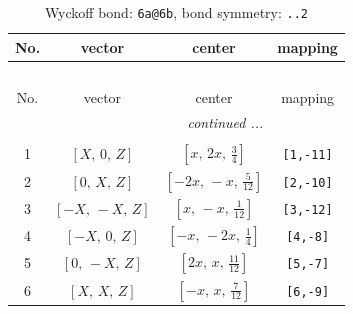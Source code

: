 \documentclass[fleqn,8pt]{jsarticle}
\begin{document}
\renewcommand{\arraystretch}{1.2}
\begin{longtable}{cccc}
\caption{Wyckoff bond: {\tt 6a@6b}, bond symmetry: {\tt ..2}}
 \\
 \hline \hline
No. & vector & center & mapping \\ \hline \endfirsthead

\multicolumn{3}{l}{\tablename\ \thetable{}} \\
 \hline \hline
No. & vector & center & mapping \\ \hline \endhead

 \hline \hline
\multicolumn{3}{r}{\footnotesize\it continued ...} \\ \endfoot

 \hline \hline
\multicolumn{3}{r}{} \\ \endlastfoot

1 & $\left[ X,\, 0,\, Z \right]$ & $\left[ x,\, 2 x,\, \frac{3}{4} \right]$ & {\tt [1,-11]} \\ \hline
2 & $\left[ 0,\, X,\, Z \right]$ & $\left[ - 2 x,\, - x,\, \frac{5}{12} \right]$ & {\tt [2,-10]} \\ \hline
3 & $\left[ - X,\, - X,\, Z \right]$ & $\left[ x,\, - x,\, \frac{1}{12} \right]$ & {\tt [3,-12]} \\ \hline
4 & $\left[ - X,\, 0,\, Z \right]$ & $\left[ - x,\, - 2 x,\, \frac{1}{4} \right]$ & {\tt [4,-8]} \\ \hline
5 & $\left[ 0,\, - X,\, Z \right]$ & $\left[ 2 x,\, x,\, \frac{11}{12} \right]$ & {\tt [5,-7]} \\ \hline
6 & $\left[ X,\, X,\, Z \right]$ & $\left[ - x,\, x,\, \frac{7}{12} \right]$ & {\tt [6,-9]} \\
\end{longtable}
\renewcommand{\arraystretch}{1.2}
\end{document}
